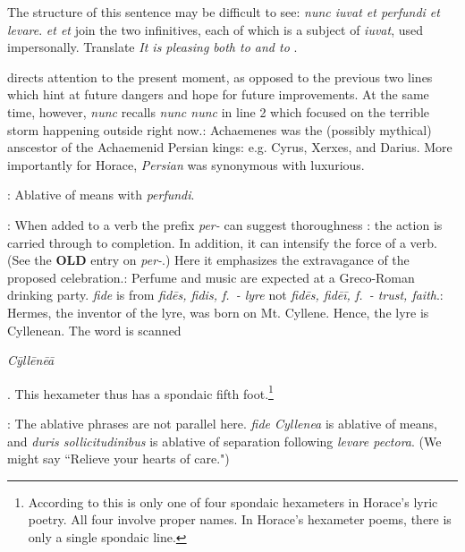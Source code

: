 
The structure of this sentence may be difficult to see: \textit{nunc iuvat et perfundi et levare}.  \textit{et \lips et} join the two infinitives, each of which is a subject of \textit{iuvat}, used impersonally.  Translate \textit{It is pleasing both to \lips and to \lips}.


 directs attention to the present moment, as opposed to the previous two lines which hint at future dangers and hope for future improvements.  At the same time, however, \textit{nunc} recalls \textit{nunc \lips nunc} in line 2 which focused on the terrible storm happening outside right now.\indent{}: Achaemenes was the (possibly mythical) anscestor of the Achaemenid Persian kings: e.g. Cyrus, Xerxes, and Darius.  More importantly for Horace, \textit{Persian} was synonymous with luxurious.


: Ablative of means with \textit{perfundi}.


: When added to a verb the prefix \textit{per-} can suggest thoroughness : the action is carried through to completion.  In addition, it can intensify the force of a verb.  (See the \textbf{OLD} entry on \textit{per-}.)  Here it emphasizes the extravagance of the proposed celebration.\indent{}: Perfume and music are expected at a Greco-Roman drinking party.  \textit{fide} is from \textit{fidēs, fidis, f.\ - lyre} not  \textit{fidēs, fidēī, f.\ - trust, faith}.\indent{}:  Hermes, the inventor of the lyre, was born on Mt. Cyllene.  Hence, the lyre is Cyllenean.  The word is scanned \begin{metrica}\textit{C\=yll\=en\=e\=a}\end{metrica}.  This hexameter thus has a spondaic fifth foot.\footnote{According to \citet[220]{mankin1995} this is only one of four spondaic hexameters in Horace's lyric poetry.  All four involve proper names.  In Horace's hexameter poems, there is only a single spondaic line.}


: The ablative phrases are not parallel here.  \textit{fide Cyllenea} is ablative of means, and \textit{duris sollicitudinibus} is ablative of separation following \textit{levare pectora}.  (We might say ``Relieve your hearts of care.") 


